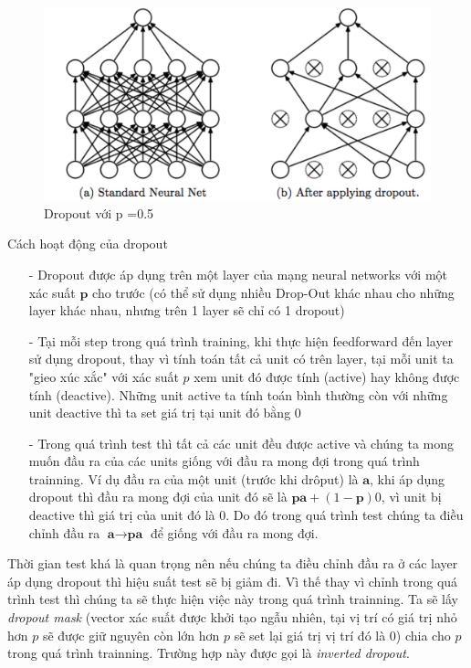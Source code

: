 \begin{enumerate}
\begin{center}
 	\begin{figure}[H]
    \begin{center}
    \includegraphics[scale=0.4]{chap3/image/dropout.png}
    \end{center}
    \caption{Dropout với p =0.5}
    \label{fig:dropout}
    \end{figure}
\end{center}

Cách hoạt động của dropout
\begin{itemize}
\item[-] Dropout được áp dụng trên một layer của mạng neural networks với một xác suất $\textbf{p}$ cho trước (có thể sử dụng nhiều Drop-Out khác nhau cho những layer khác nhau, nhưng trên 1 layer sẽ chỉ có 1 dropout)
\item[-] Tại mỗi step trong quá trình training, khi thực hiện feedforward đến layer sử dụng dropout, thay vì tính toán tất cả unit có trên layer, tại mỗi unit ta "gieo xúc xắc" với xác suất $p$ xem unit đó được tính (active) hay không được tính (deactive). Những unit active ta tính toán bình thường còn với những unit deactive thì ta set giá trị tại unit đó bằng 0
\item[-] Trong quá trình test thì tất cả các unit đều được active và chúng ta mong muốn đầu ra của các units giống với đầu ra mong đợi trong quá trình trainning. Ví dụ đầu ra của một unit (trước khi drôput) là $\textbf{a}$, khi áp dụng dropout thì đầu ra mong đợi của unit đó sẽ là $\textbf{p}\textbf{a} + (1-\textbf{p})0$, vì unit bị deactive thì giá trị của unit đó là 0. Do đó trong quá trình test chúng ta điều chỉnh đầu ra $\textbf{a} \to \textbf{p}\textbf{a}$ để  giống với đầu ra mong đợi.
\end{itemize} 
Thời gian test khá là quan trọng nên nếu chúng ta điều chỉnh đầu ra ở các layer áp dụng dropout thì hiệu suất test sẽ bị giảm đi. Vì thế thay vì chỉnh trong quá trình test thì chúng ta sẽ thực hiện việc này trong quá trình trainning. Ta sẽ lấy \textit{dropout mask} (vector xác suất được khởi tạo ngẫu nhiên, tại vị trí có giá trị nhỏ hơn $p$ sẽ được giữ nguyên còn lớn hơn $p$ sẽ set lại giá trị vị trí đó là 0) chia cho $p$ trong quá trình trainning. Trường hợp này được gọi là \textit{inverted dropout}.
\end{enumerate}

